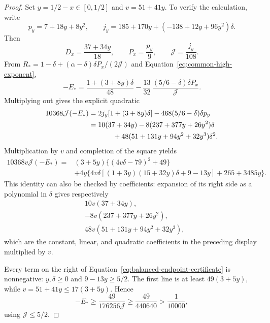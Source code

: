 \begin{proof}
Set \(y=1/2-x\in[0,1/2]\) and \(v=51+41y\).  To verify the
calculation, write
\[
 p_y=7+18y+8y^2,\qquad
 j_y=185+170y+(-138+12y+96y^2)\delta.
\]
Then
\[
 D_x=\frac{37+34y}{18},\qquad
 P_x=\frac{p_y}{9},\qquad
 \mathcal J=\frac{j_y}{108}.
\]
From \(R_*=1-\delta+(\alpha-\delta)\delta P_x/(2\mathcal J)\)
and Equation~\eqref{eq:common-high-exponent},
\[
 -E_*=
 \frac{1+(3+8y)\delta}{48}
 -\frac{13}{32}\,
   \frac{(5/6-\delta)\delta P_x}{\mathcal J}.
\]
Multiplying out gives the explicit quadratic
\[
 \begin{split}
 10368\mathcal J(-E_*)
 &=2j_y[1+(3+8y)\delta]
     -468(5/6-\delta)\delta p_y\\
 &=10(37+34y)
   -8(237+377y+26y^2)\delta\\
 &\hspace{12mm}
   +48(51+131y+94y^2+32y^3)\delta^2.
 \end{split}
\]
Multiplication by \(v\) and completion of the square yields
\begin{equation}
 \begin{aligned}
 10368v\mathcal J(-E_*)
 ={}&(3+5y)\bigl\{(4v\delta-79)^2+49\bigr\}\\
 &+4y\bigl\{
 4v\delta[(1+3y)(15+32y)\delta+9-13y]
       +265+3485y\bigr\}.
 \end{aligned}
 \label{eq:balanced-endpoint-certificate}
\end{equation}
This identity can also be checked by coefficients: expansion of
its right side as a polynomial in \(\delta\) gives respectively
\[
 \begin{split}
 &10v(37+34y),\\
 &-8v(237+377y+26y^2),\\
 &48v(51+131y+94y^2+32y^3),
 \end{split}
\]
which are the constant, linear, and quadratic coefficients in
the preceding display multiplied by \(v\).

Every term on the right of
Equation~\eqref{eq:balanced-endpoint-certificate} is nonnegative:
\(y,\delta\ge0\) and \(9-13y\ge5/2\).
The first line is at least \(49(3+5y)\), while
\(v=51+41y\le17(3+5y)\).  Hence
\[
 -E_*\ge\frac{49}{176256\mathcal J}
       \ge\frac{49}{440640}>\frac1{10000},
\]
using \(\mathcal J\le5/2\).
\end{proof}


